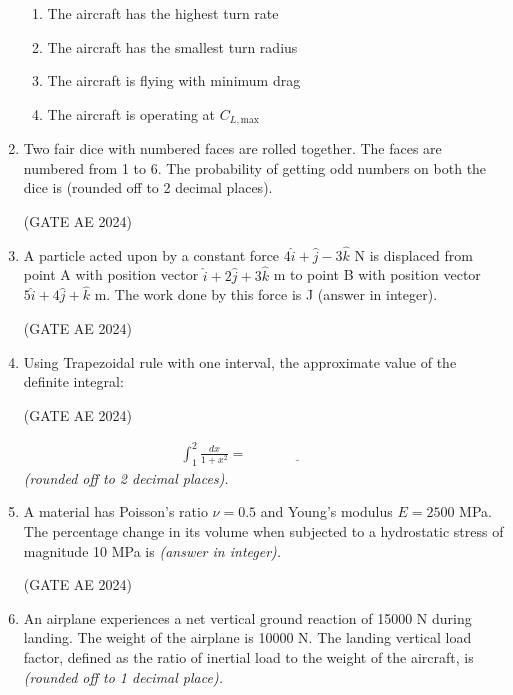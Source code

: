\documentclass[journal,12pt,onecolumn]{IEEEtran}
\theoremstyle{remark}
\begin{document}
\begin{flushleft}
\begin{enumerate}
\begin{enumerate}
    \item The aircraft has the highest turn rate
    \item The aircraft has the smallest turn radius
    \item The aircraft is flying with minimum drag
    \item The aircraft is operating at $C_{L,\text{max}}$
\end{enumerate}

\item Two fair dice with numbered faces are rolled together. The faces are numbered from 1 to 6. The probability of getting odd numbers on both the dice is \underline{\hspace{3cm}} (rounded off to 2 decimal places).

\hfill (GATE AE 2024)

\item A particle acted upon by a constant force $4\hat{i} + \hat{j} - 3\hat{k}$ N is displaced from point A with position vector $\hat{i} + 2\hat{j} + 3\hat{k}$ m to point B with position vector $5\hat{i} + 4\hat{j} + \hat{k}$ m. The work done by this force is \underline{\hspace{3cm}} J (answer in integer).

\hfill (GATE AE 2024)

\item Using Trapezoidal rule with one interval, the approximate value of the definite integral:

\hfill (GATE AE 2024)

\begin{align*}
\int_{1}^{2} \frac{dx}{1 + x^2}= \underline{\hspace{3cm}}
\end{align*}
\textit{(rounded off to 2 decimal places).}


\item A material has Poisson's ratio $\nu = 0.5$ and Young's modulus $E = 2500$ MPa. The percentage change in its volume when subjected to a hydrostatic stress of magnitude 10 MPa is \underline{\hspace{3cm}} \textit{(answer in integer).}

\hfill (GATE AE 2024)

\item An airplane experiences a net vertical ground reaction of 15000 N during landing. The weight of the airplane is 10000 N. The landing vertical load factor, defined as the ratio of inertial load to the weight of the aircraft, is \underline{\hspace{3cm}} \textit{(rounded off to 1 decimal place).}


\end{enumerate}
\end{flushleft}
\end{document}
